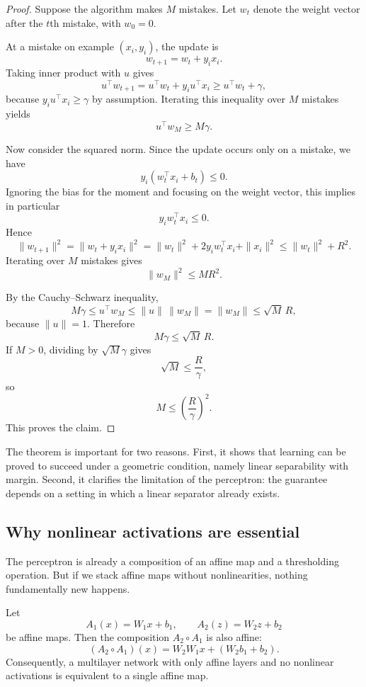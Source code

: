 \begin{proof}
Suppose the algorithm makes $M$ mistakes. Let $w_t$ denote the weight vector after the $t$th mistake, with $w_0=0$.

At a mistake on example $(x_i,y_i)$, the update is
\[
w_{t+1}=w_t+y_i x_i.
\]
Taking inner product with $u$ gives
\[
u^\top w_{t+1}
=
u^\top w_t + y_i u^\top x_i
\ge
u^\top w_t + \gamma,
\]
because $y_i u^\top x_i\ge \gamma$ by assumption. Iterating this inequality over $M$ mistakes yields
\[
u^\top w_M \ge M\gamma.
\]

Now consider the squared norm. Since the update occurs only on a mistake, we have
\[
y_i(w_t^\top x_i+b_t)\le 0.
\]
Ignoring the bias for the moment and focusing on the weight vector, this implies in particular
\[
y_i w_t^\top x_i \le 0.
\]
Hence
\[
\|w_{t+1}\|^2
=
\|w_t+y_i x_i\|^2
=
\|w_t\|^2 + 2 y_i w_t^\top x_i + \|x_i\|^2
\le
\|w_t\|^2 + R^2.
\]
Iterating over $M$ mistakes gives
\[
\|w_M\|^2 \le M R^2.
\]

By the Cauchy--Schwarz inequality,
\[
M\gamma
\le
u^\top w_M
\le
\|u\|\,\|w_M\|
=
\|w_M\|
\le
\sqrt{M}\,R,
\]
because $\|u\|=1$. Therefore
\[
M\gamma \le \sqrt{M}\,R.
\]
If $M>0$, dividing by $\sqrt{M}\gamma$ gives
\[
\sqrt{M}\le \frac{R}{\gamma},
\]
so
\[
M\le \left(\frac{R}{\gamma}\right)^2.
\]
This proves the claim.
\end{proof}

The theorem is important for two reasons. First, it shows that learning can be proved to succeed under a geometric condition, namely linear separability with margin. Second, it clarifies the limitation of the perceptron: the guarantee depends on a setting in which a linear separator already exists.

\subsection*{Why nonlinear activations are essential}

The perceptron is already a composition of an affine map and a thresholding operation. But if we stack affine maps without nonlinearities, nothing fundamentally new happens.

\begin{proposition}
Let
\[
A_1(x)=W_1x+b_1,
\qquad
A_2(z)=W_2z+b_2
\]
be affine maps. Then the composition $A_2\circ A_1$ is also affine:
\[
(A_2\circ A_1)(x)=W_2W_1x + (W_2b_1+b_2).
\]
Consequently, a multilayer network with only affine layers and no nonlinear activations is equivalent to a single affine map.
\end{proposition}

